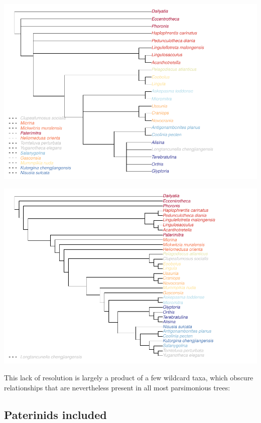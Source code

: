 \documentclass[]{book}
\theoremstyle{definition}
\theoremstyle{definition}
\theoremstyle{definition}
\theoremstyle{remark}
\begin{document}
\includegraphics{Brachiopod_phylogeny_files/figure-latex/unnamed-chunk-8-1.pdf}

\includegraphics{Brachiopod_phylogeny_files/figure-latex/unnamed-chunk-9-1.pdf}

This lack of resolution is largely a product of a few wildcard taxa,
which obscure relationships that are nevertheless present in all most
parsimonious trees:

\hypertarget{paterinids-included}{%
\subsection{Paterinids included}\label{paterinids-included}}
\end{document}

